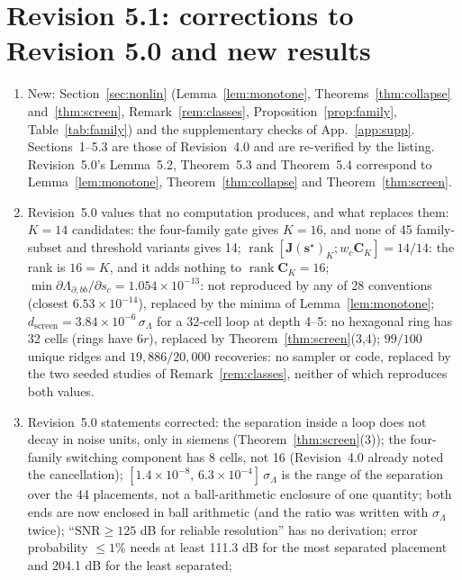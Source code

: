 \documentclass[11pt,a4paper]{article}
\theoremstyle{definition}
\theoremstyle{remark}
\begin{document}
\section*{Revision 5.1: corrections to Revision 5.0 and new results}
\begin{enumerate}[noitemsep,leftmargin=*]
\item New: Section~\ref{sec:nonlin} (Lemma~\ref{lem:monotone}, Theorems~\ref{thm:collapse} and~\ref{thm:screen}, Remark~\ref{rem:classes}, Proposition~\ref{prop:family}, Table~\ref{tab:family}) and the supplementary checks of App.~\ref{app:supp}. Sections~1--5.3 are those of Revision~4.0 and are re-verified by the listing. Revision~5.0's Lemma~5.2, Theorem~5.3 and Theorem~5.4 correspond to Lemma~\ref{lem:monotone}, Theorem~\ref{thm:collapse} and Theorem~\ref{thm:screen}.
\item Revision~5.0 values that no computation produces, and what replaces them:
  $K = 14$ candidates: the four-family gate gives $K = 16$, and none of 45 family-subset and threshold variants gives 14;
  $\operatorname{rank}[\mathbf{J}(\mathbf{s}^\star)_K;w_c\mathbf{C}_K] = 14/14$: the rank is $16 = K$, and it adds nothing to $\operatorname{rank}\mathbf{C}_K = 16$;
  $\min\partial\Lambda_{\partial,bb}/\partial s_c = 1.054\times10^{-13}$: not reproduced by any of 28 conventions (closest $6.53\times10^{-14}$), replaced by the minima of Lemma~\ref{lem:monotone};
  $d_{\text{screen}} = 3.84\times10^{-6}\,\sigma_\Lambda$ for a 32-cell loop at depth 4--5: no hexagonal ring has 32 cells (rings have $6r$), replaced by Theorem~\ref{thm:screen}(3,4);
  $99/100$ unique ridges and $19{,}886/20{,}000$ recoveries: no sampler or code, replaced by the two seeded studies of Remark~\ref{rem:classes}, neither of which reproduces both values.
\item Revision~5.0 statements corrected:
  the separation inside a loop does not decay in noise units, only in siemens (Theorem~\ref{thm:screen}(3));
  the four-family switching component has 8 cells, not 16 (Revision~4.0 already noted the cancellation);
  $[1.4\times10^{-8},\,6.3\times10^{-4}]\,\sigma_\Lambda$ is the range of the separation over the 44 placements, not a ball-arithmetic enclosure of one quantity; both ends are now enclosed in ball arithmetic (and the ratio was written with $\sigma_\Lambda$ twice);
  ``$\text{SNR}\ge125$ dB for reliable resolution'' has no derivation; error probability $\le1\%$ needs at least 111.3 dB for the most separated placement and 204.1 dB for the least separated;

\end{enumerate}
\end{document}

